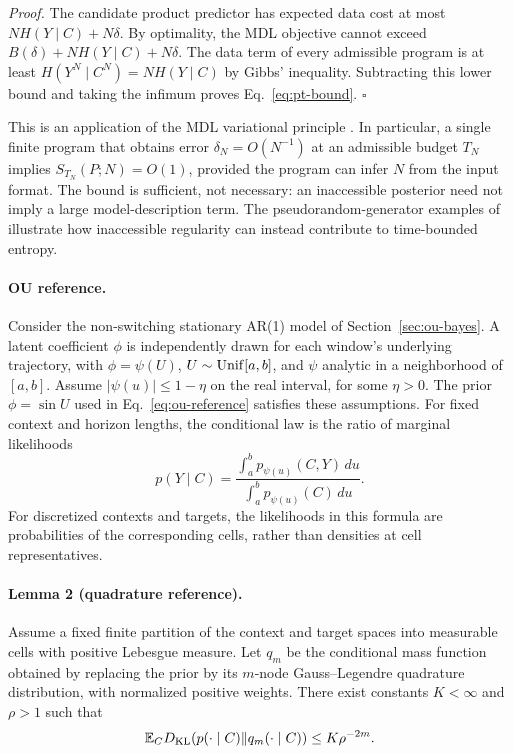 \documentclass[10pt,a4paper]{article}
\theoremstyle{definition}
\begin{document}
\emph{Proof.}
The candidate product predictor has expected data cost at most
$NH(Y\mid C)+N\delta$. By optimality, the MDL objective cannot exceed
$B(\delta)+NH(Y\mid C)+N\delta$. The data term of every admissible
program is at least $H(Y^N\mid C^N)=NH(Y\mid C)$ by Gibbs' inequality.
Subtracting this lower bound and taking the infimum proves
Eq.~\eqref{eq:pt-bound}. \hfill$\square$

This is an application of the MDL variational principle
\cite{rissanen1978,finzi2026}. In particular, a single finite program
that obtains error $\delta_N=O(N^{-1})$ at an admissible budget $T_N$
implies $S_{T_N}(P;N)=O(1)$, provided the program can infer $N$ from
the input format. The bound is sufficient, not necessary: an
inaccessible posterior need not imply a large model-description term.
The pseudorandom-generator examples of \citet{finzi2026} illustrate
how inaccessible regularity can instead contribute to time-bounded
entropy.

\paragraph{OU reference.}
Consider the non-switching stationary AR(1) model of
Section~\ref{sec:ou-bayes}. A latent coefficient $\phi$ is independently
drawn for each window's underlying trajectory, with
$\phi=\psi(U)$, $U\sim{\rm Unif}[a,b]$, and $\psi$ analytic in a
neighborhood of $[a,b]$. Assume $|\psi(u)|\leq1-\eta$ on the real
interval, for some $\eta>0$. The prior $\phi=\sin U$ used in
Eq.~\eqref{eq:ou-reference} satisfies these assumptions.
For fixed context and horizon lengths, the conditional law is the ratio
of marginal likelihoods
\[
 p(Y\mid C)=\frac{\int_a^b p_{\psi(u)}(C,Y)\,du}
                  {\int_a^b p_{\psi(u)}(C)\,du}.
\]
For discretized contexts and targets, the likelihoods in this formula
are probabilities of the corresponding cells, rather than densities
at cell representatives.

\paragraph{Lemma 2 (quadrature reference).}
Assume a fixed finite partition of the context and target spaces
into measurable cells with positive Lebesgue measure. Let $q_m$ be
the conditional mass function obtained by replacing the prior by
its $m$-node Gauss--Legendre quadrature distribution, with normalized
positive weights. There exist constants $K<\infty$ and $\rho>1$ such
that
\begin{equation}
 \mathbb E_C D_{\rm KL}(p(\cdot\mid C)\Vert q_m(\cdot\mid C))
 \leq K\rho^{-2m}.
 \label{eq:pt-quadrature}
\end{equation}
\end{document}
